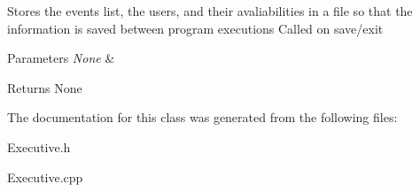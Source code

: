 Stores the events list, the users, and their avaliabilities in a file so that the information is saved between program executions Called on save/exit 
\begin{DoxyParams}{Parameters}
{\em None} & \\
\hline
\end{DoxyParams}
\begin{DoxyReturn}{Returns}
None 
\end{DoxyReturn}


The documentation for this class was generated from the following files\+:\begin{DoxyCompactItemize}
\item 
Executive.\+h\item 
Executive.\+cpp\end{DoxyCompactItemize}

